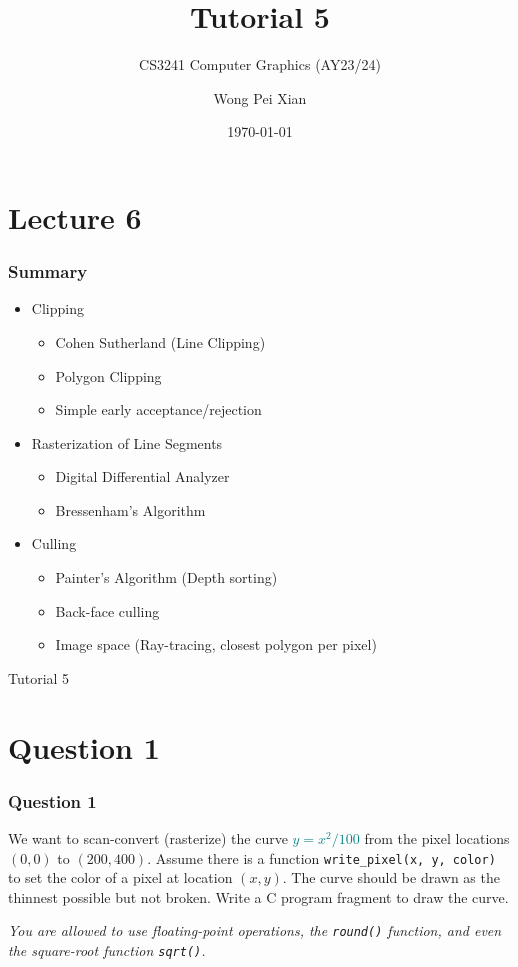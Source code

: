 \documentclass{beamer}
\title{Tutorial 5}
\subtitle{CS3241 Computer Graphics (AY23/24)}
\date{\today}
\author{Wong Pei Xian}
\institute[]{\email{e0389023@u.nus.edu}}
\begin{document}
\frame[plain]{\titlepage}

\section{Lecture 6}

\begin{frame}
    \frametitle{Summary}

    \begin{itemize}
        \item Clipping 
        \begin{itemize}
            \item Cohen Sutherland (Line Clipping)
            \item Polygon Clipping
            \item Simple early acceptance/rejection
        \end{itemize}
        \item Rasterization of Line Segments
        \begin{itemize}
            \item Digital Differential Analyzer
            \item Bressenham's Algorithm
        \end{itemize}
        \item Culling
        \begin{itemize}
            \item Painter's Algorithm (Depth sorting)
            \item Back-face culling
            \item Image space (Ray-tracing, closest polygon per pixel)
            \end{itemize}
    \end{itemize}

\end{frame}

\begin{frame}
    \AlegreyaExtraBold \LARGE
    Tutorial 5
\end{frame}

\section{Question 1}

\begin{frame}
    \frametitle{Question 1}
    We want to scan-convert (rasterize) the curve \textcolor{teal}{$y = x^2 / 100$} from the pixel locations $(0, 0)$ to $(200, 400)$. 
    Assume there is a function \texttt{write\_pixel(x, y, color)} to set the color of a pixel at location $(x, y)$. 
    The curve should be drawn as the thinnest possible but not broken. 
    Write a C program fragment to draw the curve. 

    \vspace{1em}
    
    \textit{You are allowed to use floating-point operations, the \texttt{round()} function, and even the square-root function \texttt{sqrt()}.}
\end{frame}
\end{document}
